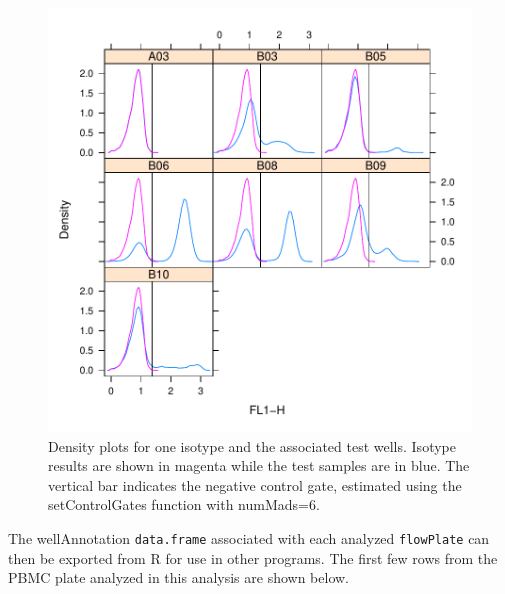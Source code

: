\documentclass[12pt]{article}
\newcommand{\Robject}[1]{{\texttt{#1}}}
\begin{document}
\begin{figure}
\includegraphics{outline-isoGate}
\caption{Density plots for one isotype and the associated test wells. Isotype results are shown in magenta while the test samples
are in blue. The vertical bar indicates the negative control gate, estimated using the setControlGates function with numMads=6.}
\label{fig:isoGate}
\end{figure}

\clearpage
The wellAnnotation \Robject{data.frame} associated with each analyzed \Robject{flowPlate} can then be exported from R for
use in other programs. The first few rows from the PBMC plate analyzed in this analysis are shown below.
\end{document}
